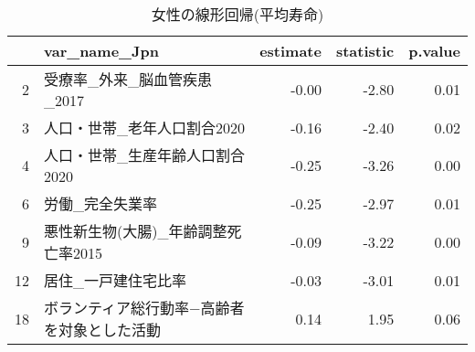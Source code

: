 \begin{table}[H]
\centering
\caption{女性の線形回帰(平均寿命)}
\label{UsualLMLEf}
\begingroup\tiny

\begin{adjustbox}{width=1\textwidth}
\begin{tabular}{rlrrr}
  \hline
 & var\_name\_Jpn & estimate & statistic & p.value \\
  \hline
  2 & 受療率\_外来\_脳血管疾患\_2017 & -0.00 & -2.80 & 0.01 \\
  3 & 人口・世帯\_老年人口割合2020 & -0.16 & -2.40 & 0.02 \\
  4 & 人口・世帯\_生産年齢人口割合2020 & -0.25 & -3.26 & 0.00 \\
  6 & 労働\_完全失業率 & -0.25 & -2.97 & 0.01 \\
  9 & 悪性新生物(大腸)\_年齢調整死亡率2015 & -0.09 & -3.22 & 0.00 \\
  12 & 居住\_一戸建住宅比率 & -0.03 & -3.01 & 0.01 \\
  18 & ボランティア総行動率−高齢者を対象とした活動 & 0.14 & 1.95 & 0.06 \\
   \hline
\end{tabular}
\end{adjustbox}

\endgroup
\end{table}
